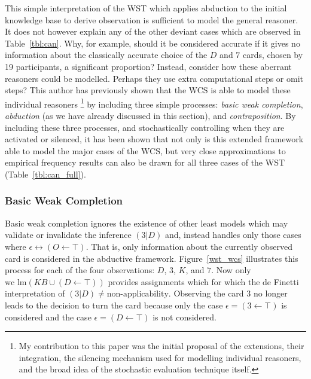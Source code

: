 This simple interpretation of the WST which applies abduction to the initial knowledge base to derive observation is sufficient to model the general reasoner. It does not however explain any of the other deviant cases which are observed in Table~\ref{tbl:can}. Why, for example, should it be considered accurate if it gives no information about the classically accurate choice of the $D$ and $7$ cards, chosen by 19 participants, a significant proportion? Instead, consider how these aberrant reasoners could be modelled. Perhaps they use extra computational steps or omit steps? This author has previously shown that the WCS is able to model these individual reasoners \citep{breu2019weak}\footnote{My contribution to this paper was the initial proposal of the extensions, their integration, the silencing mechanism used for modelling individual reasoners, and the broad idea of the stochastic evaluation technique itself.} by including three simple processes: \textit{basic weak completion}, \textit{abduction} (as we have already discussed in this section), and \textit{contraposition}. By including these three processes, and stochastically controlling when they are activated or silenced, it has been shown that not only is this extended framework able to model the major cases of the WCS, but very close approximations to empirical frequency results can also be drawn for all three cases of the WST (Table~\ref{tbl:can_full}).

\subsubsection*{Basic Weak Completion}

Basic weak completion ignores the existence of other least models which may validate or invalidate the inference $(3|D)$ and, instead handles only those cases where $\epsilon \leftrightarrow (O\leftarrow \top)$. That is, only information about the currently observed card is considered in the abductive framework. Figure~\ref{wst_wcs} illustrates this process for each of the four observations: $D$, $3$, $K$, and $7$. Now only $\textrm{wc lm}(KB \cup (D \leftarrow \top))$ provides assignments which for which the de Finetti interpretation of $(3|D)\neq \textrm{non-applicability}$. Observing the card $3$ no longer leads to the decision to turn the card because only the case $\epsilon = (3\leftarrow \top)$ is considered and the case $\epsilon = (D \leftarrow \top)$ is not considered.

